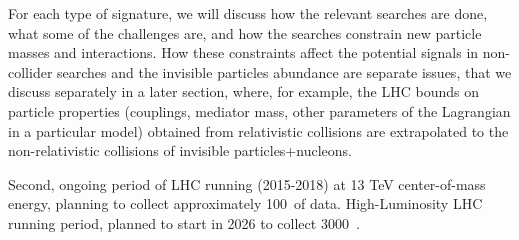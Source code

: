 For each type of signature, we will discuss how the relevant searches are done, what some of the challenges are, and how the searches constrain new particle masses and interactions. 
How these constraints affect the potential signals in non-collider searches and the invisible particles abundance are separate issues, that we discuss separately in a later section, where, for example, the LHC bounds on particle properties (couplings, mediator mass, other parameters of the Lagrangian in a particular model) obtained from relativistic collisions are extrapolated to the non-relativistic collisions of invisible particles+nucleons. 


\begin{marginnote}[]
 {Second, ongoing period of LHC running (2015-2018) at 13 TeV center-of-mass energy, planning to collect approximately 100~\ifb of data.}
 {High-Luminosity LHC running period, planned to start in 2026 to collect 3000~\ifb.}
\end{marginnote}


